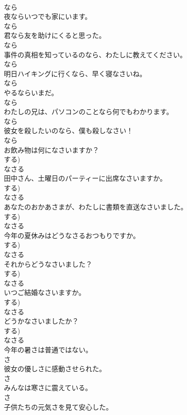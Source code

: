 \documentclass[8pt]{extreport}
\begin{document}
\begin{CJK}{UTF8}{min}
\\	なら
\\	夜ならいつでも家にいます。	
\\	なら
\\	君なら友を助けにくると思った。	
\\	なら
\\	事件の真相を知っているのなら、わたしに教えてください。	
\\	なら
\\	明日ハイキングに行くなら、早く寝なさいね。	
\\	なら
\\	やるならいまだ。	
\\	なら
\\	わたしの兄は、パソコンのことなら何でもわかります。	
\\	なら
\\	彼女を殺したいのなら、僕も殺しなさい！	
\\	なら
\\	お飲み物は何になさいますか？	
\\	する)	
\\	なさる
\\	田中さん、土曜日のパーティーに出席なさいますか。	
\\	する)	
\\	なさる
\\	あなたのおかあさまが、わたしに書類を直送なさいました。	
\\	する)	
\\	なさる
\\	今年の夏休みはどうなさるおつもりですか。	
\\	する)	
\\	なさる
\\	それからどうなさいました？	
\\	する)	
\\	なさる
\\	いつご結婚なさいますか。	
\\	する)	
\\	なさる
\\	どうかなさいましたか？	
\\	する)	
\\	なさる
\\	今年の暑さは普通ではない。	
\\	さ
\\	彼女の優しさに感動させられた。	
\\	さ
\\	みんなは寒さに震えている。	
\\	さ
\\	子供たちの元気さを見て安心した。	

\end{CJK}
\end{document}
